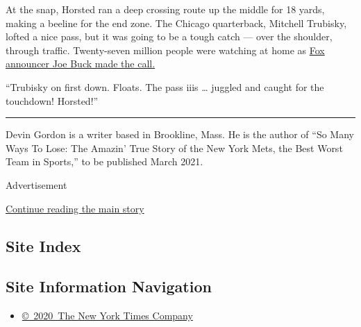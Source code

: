 At the snap, Horsted ran a deep crossing route up the middle for 18
yards, making a beeline for the end zone. The Chicago quarterback,
Mitchell Trubisky, lofted a nice pass, but it was going to be a tough
catch --- over the shoulder, through traffic. Twenty-seven million
people were watching at home as
\href{https://twitter.com/NFL/status/1200142027486310406?s=20}{Fox
announcer Joe Buck made the call.}

``Trubisky on first down. Floats. The pass iiis \ldots{} juggled and
caught for the touchdown! Horsted!''

\begin{center}\rule{0.5\linewidth}{\linethickness}\end{center}

Devin Gordon is a writer based in Brookline, Mass. He is the author of
``So Many Ways To Lose: The Amazin' True Story of the New York Mets, the
Best Worst Team in Sports,'' to be published March 2021.

Advertisement

\protect\hyperlink{after-bottom}{Continue reading the main story}

\hypertarget{site-index}{%
\subsection{Site Index}\label{site-index}}

\hypertarget{site-information-navigation}{%
\subsection{Site Information
Navigation}\label{site-information-navigation}}

\begin{itemize}
\tightlist
\item
  \href{https://help.nytimes3xbfgragh.onion/hc/en-us/articles/115014792127-Copyright-notice}{©~2020~The
  New York Times Company}
\end{itemize}

